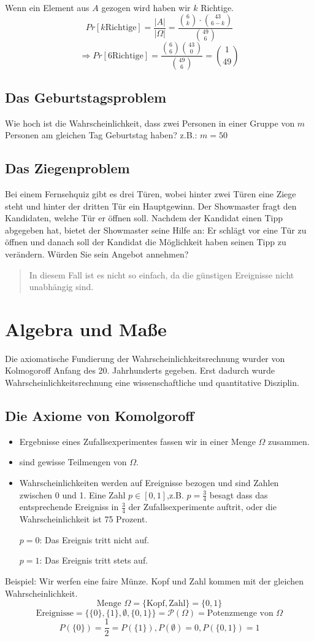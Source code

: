 Wenn ein Element aus $A$ gezogen wird haben wir $k$ Richtige.%
$$ Pr[k \textrm{Richtige}]=\frac{\left| A \right|}{\left| \Omega \right|} = \frac{\binom{6}{k} \cdot \binom{43}{6-k}}{\binom{49}{6}}$$
$$\Rightarrow Pr[6 \textrm{Richtige}]= \frac{\binom{6}{6} \binom{43}{0}}{\binom{49}{6}}=\binom{1}{49}$$
\subsection{Das Geburtstagsproblem}
Wie hoch ist die Wahrscheinlichkeit, dass zwei Personen in einer Gruppe von $m$ Personen am gleichen Tag Geburtstag haben?
z.B.: $m=50$
\subsection{Das Ziegenproblem}
Bei einem Fernsehquiz gibt es drei Türen, wobei hinter zwei Türen eine Ziege steht und hinter der dritten Tür ein Hauptgewinn. %
Der Showmaster fragt den Kandidaten, welche Tür er öffnen soll. Nachdem der Kandidat einen Tipp abgegeben hat, bietet der Showmaster seine Hilfe an: %
Er schlägt vor eine Tür zu öffnen und danach soll der Kandidat die Möglichkeit haben seinen Tipp zu verändern.%
Würden Sie sein Angebot annehmen?
\begin{quote}
 In diesem Fall ist es nicht so einfach, da die günstigen Ereignisse nicht unabhängig sind.
\end{quote}
\section{Algebra und Maße}
Die axiomatische Fundierung der Wahrscheinlichkeitsrechnung wurder von Kolmogoroff Anfang des 20. Jahrhunderts gegeben. Erst dadurch wurde Wahrscheinlichkeitsrechnung eine wissenschaftliche und quantitative Disziplin.
\subsection{Die Axiome von Komolgoroff}
\begin{itemize}
 \item Ergebnisse eines Zufallsexperimentes fassen wir in einer Menge $\Omega$ zusammen.
 \item {} sind gewisse Teilmengen von $\Omega$.
 \item Wahrscheinlichkeiten werden auf Ereignisse bezogen und sind Zahlen zwischen 0 und 1. Eine Zahl $p \in [0,1]$,z.B. $p=\frac{3}{4}$ besagt dass das entsprechende Ereigniss in $\frac{3}{4}$ der Zufallsexperimente auftrit, oder die Wahrscheinlichkeit ist 75 Prozent.

$p=0$: Das Ereignis tritt nicht auf.

$p=1$: Das Ereignis tritt stets auf.
\end{itemize}
Beispiel: Wir werfen eine faire Münze. Kopf und Zahl kommen mit der gleichen Wahrscheinlichkeit.
$$ \textrm{Menge } \Omega = \{\textrm{Kopf},\textrm{Zahl}\} = \{0,1\} $$
$$ \textrm{Ereignisse} = \{\{0\},\{1\},\emptyset,\{0,1\}\} = \mathcal P(\Omega) = \textrm{Potenzmenge von } \Omega $$
$$ P(\{0\})=\frac{1}{2}=P(\{1\}), P(\emptyset)=0 , P(\{0,1\})=1$$
